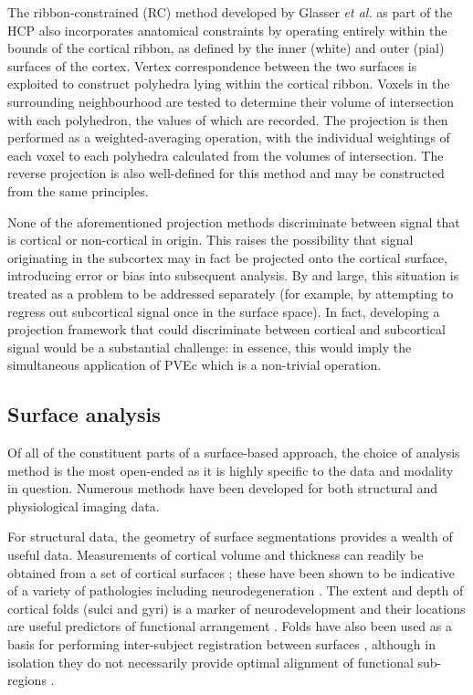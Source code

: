\documentclass[12pt]{report}
\begin{document}
The ribbon-constrained (RC) method developed by Glasser \textit{et al.} \cite{Glasser2013} as part of the HCP also incorporates anatomical constraints by operating entirely within the bounds of the cortical ribbon, as defined by the inner (white) and outer (pial) surfaces of the cortex. Vertex correspondence between the two surfaces is exploited to construct polyhedra lying within the cortical ribbon. Voxels in the surrounding neighbourhood are tested to determine their volume of intersection with each polyhedron, the values of which are recorded. The projection is then performed as a weighted-averaging operation, with the individual weightings of each voxel to each polyhedra calculated from the volumes of intersection. The reverse projection is also well-defined for this method and may be constructed from the same principles.

None of the aforementioned projection methods discriminate between signal that is cortical or non-cortical in origin. This raises the possibility that signal originating in the subcortex may in fact be projected onto the cortical surface, introducing error or bias into subsequent analysis. By and large, this situation is treated as a problem to be addressed separately (for example, by attempting to regress out subcortical signal once in the surface space). In fact, developing a projection framework that could discriminate between cortical and subcortical signal would be a substantial challenge: in essence, this would imply the simultaneous application of PVEc which is a non-trivial operation. 

\subsection{Surface analysis}

Of all of the constituent parts of a surface-based approach, the choice of analysis method is the most open-ended as it is highly specific to the data and modality in question. Numerous methods have been developed for both structural and physiological imaging data. 

For structural data, the geometry of surface segmentations provides a wealth of useful data. Measurements of cortical volume and thickness can readily be obtained from a set of cortical surfaces \cite{Fischl1999a}; these have been shown to be indicative of a variety of pathologies including neurodegeneration \cite{Harvey1993, Rimol2012, Knopman2016, Lin2017}. The extent and depth of cortical folds (sulci and gyri) is a marker of neurodevelopment \cite{Tamnes2017, Garcia2018} and their locations are useful predictors of functional arrangement \cite{Fischl2008}. Folds have also been used as a basis for performing inter-subject registration between surfaces \cite{Lyttelton2007}, although in isolation they do not necessarily provide optimal alignment of functional sub-regions \cite{Robinson2013}. 
\end{document}
